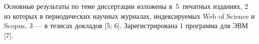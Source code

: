 {%
    {\publications} Основные результаты по теме диссертации изложены в~5~печатных изданиях,
    2 из которых в периодических научных журналах, индексируемых Web of Science и Scopus,
    3 –– в тезисах докладов [5; 6].
    Зарегистрирована 1 программа для ЭВМ [7].
}%
{%
    \begin{refsection}


\end{refsection}}

